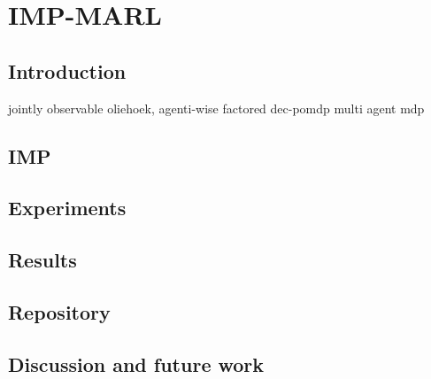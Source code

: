 \chapter{IMP-MARL}\label{ch:impmarl}

\section{Introduction}
jointly observable oliehoek, agenti-wise factored dec-pomdp
multi agent mdp

\section{IMP}
\section{Experiments}
\section{Results}
\section{Repository}
\section{Discussion and future work}